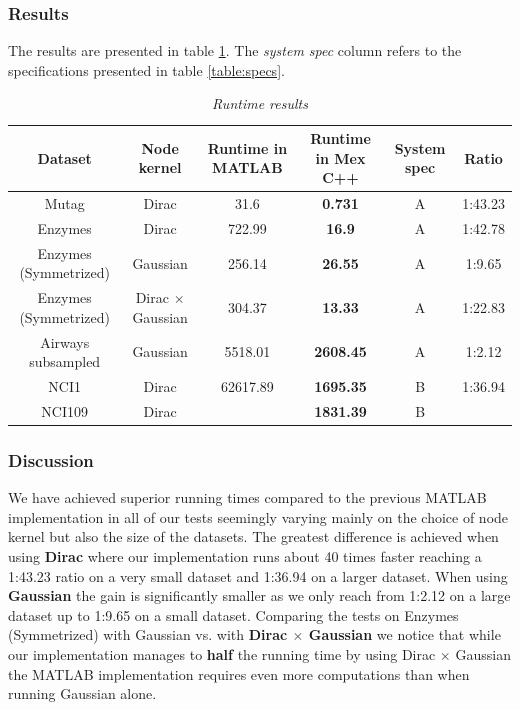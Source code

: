 \documentclass{article}
\begin{document}
\subsubsection{Results}
The results are presented in table \ref{table:runtime_results}. The \textit{system spec} column refers to the specifications presented in table \ref{table:specs}.
\begin{table}[H]
	\centering
	\hspace*{-0.7in}
	\scalebox{0.7} {
		\begin{tabular}{c|c|c|c|c|c}
			Dataset & Node kernel & Runtime in MATLAB & Runtime in Mex C++ & System spec & Ratio\\
			\hline
			Mutag & Dirac & 31.6 & \textbf{0.731} & A & 1:43.23\\
			Enzymes & Dirac & 722.99 & \textbf{16.9} & A & 1:42.78\\
			Enzymes (Symmetrized) & Gaussian & 256.14 & \textbf{26.55} & A & 1:9.65 \\ 
			Enzymes (Symmetrized) & Dirac $\times$ Gaussian & 304.37  & \textbf{13.33} & A & 1:22.83\\
			Airways subsampled & Gaussian & 5518.01 & \textbf{2608.45} & A & 1:2.12 \\
			NCI1 & Dirac & 62617.89 & \textbf{1695.35} & B & 1:36.94\\
			NCI109 & Dirac & & \textbf{1831.39} & B & 
		\end{tabular}
	}
	\caption{\textit{Runtime results}}
	\label{table:runtime_results}
\end{table}

\subsubsection{Discussion}
We have achieved superior running times compared to the previous MATLAB implementation in all of our tests seemingly varying mainly on the choice of node kernel but also the size of the datasets. The greatest difference is achieved when using \textbf{Dirac} where our implementation runs about 40 times faster reaching a 1:43.23 ratio on a very small dataset and 1:36.94 on a larger dataset. When using \textbf{Gaussian} the gain is significantly smaller as we only reach from 1:2.12 on a large dataset up to 1:9.65 on a small dataset. Comparing the tests on Enzymes (Symmetrized) with Gaussian vs. with \textbf{Dirac $\times$ Gaussian} we notice that while our implementation manages to \textbf{half} the running time by using Dirac $\times$ Gaussian the MATLAB implementation requires even more computations than when running Gaussian alone.
\end{document}
